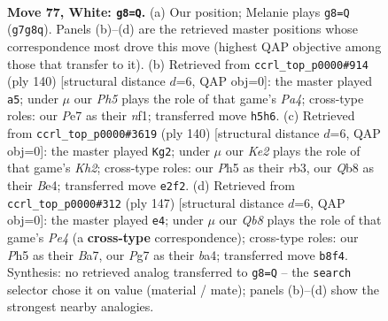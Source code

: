 \documentclass[11pt]{article}
\begin{document}
\clearpage

\begin{figure}[p]\centering
\begin{subfigure}{0.46\textwidth}\centering
\resizebox{\linewidth}{!}{%
\newchessgame
\chessboard[
  setfen={1Q6/4P1P1/k7/7P/8/8/4K3/8 w - - 1 77},
  showmover=false,
  pgfstyle=straightmove, color=movearrow, markmove={g7-g8}
]}
\caption{}
\end{subfigure}\hfill
\begin{subfigure}{0.46\textwidth}\centering
\resizebox{\linewidth}{!}{%
\newchessgame
\chessboard[
  setfen={7Q/k7/8/6K1/P7/8/8/5n2 w - - 1 71},
  showmover=false,
  pgfstyle=straightmove, color=movearrow, markmove={a4-a5}
]}
\caption{}
\end{subfigure}
\\[4pt]
\begin{subfigure}{0.46\textwidth}\centering
\resizebox{\linewidth}{!}{%
\newchessgame
\chessboard[
  setfen={7k/8/8/8/4B1PP/1r6/7K/8 w - - 1 71},
  showmover=false,
  pgfstyle=straightmove, color=movearrow, markmove={h2-g2}
]}
\caption{}
\end{subfigure}\hfill
\begin{subfigure}{0.46\textwidth}\centering
\resizebox{\linewidth}{!}{%
\newchessgame
\chessboard[
  setfen={8/b1p5/8/4p3/B7/2K2k2/8/8 b - - 1 74},
  showmover=false,
  pgfstyle=straightmove, color=movearrow, markmove={e5-e4}
]}
\caption{}
\end{subfigure}
\caption{\textbf{Move 77, White: \texttt{g8=Q}.} (a) Our position; Melanie plays \texttt{g8=Q} (\texttt{g7g8q}). Panels (b)--(d) are the retrieved master positions whose correspondence most drove this move (highest QAP objective among those that transfer to it). (b) Retrieved from \texttt{ccrl\_top\_p0000\#914} (ply 140) [structural distance $d$=6, QAP obj=0]: the master played \texttt{a5}; under $\mu$ our \emph{Ph5} plays the role of that game's \emph{Pa4}; cross-type roles: our \emph{P}e7 as their \emph{n}f1; transferred move \texttt{h5h6}. (c) Retrieved from \texttt{ccrl\_top\_p0000\#3619} (ply 140) [structural distance $d$=6, QAP obj=0]: the master played \texttt{Kg2}; under $\mu$ our \emph{Ke2} plays the role of that game's \emph{Kh2}; cross-type roles: our \emph{P}h5 as their \emph{r}b3, our \emph{Q}b8 as their \emph{B}e4; transferred move \texttt{e2f2}. (d) Retrieved from \texttt{ccrl\_top\_p0000\#312} (ply 147) [structural distance $d$=6, QAP obj=0]: the master played \texttt{e4}; under $\mu$ our \emph{Qb8} plays the role of that game's \emph{Pe4} (a \textbf{cross-type} correspondence); cross-type roles: our \emph{P}h5 as their \emph{B}a7, our \emph{P}g7 as their \emph{b}a4; transferred move \texttt{b8f4}. Synthesis: no retrieved analog transferred to \texttt{g8=Q} -- the \texttt{search} selector chose it on value (material / mate); panels (b)--(d) show the strongest nearby analogies.}
\label{fig:thought-m152}
\end{figure}
\end{document}
